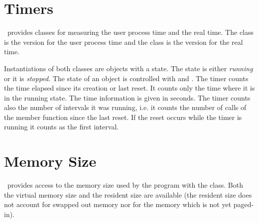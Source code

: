 
\section{Timers}

\cgal\ provides classes for measuring the user process time and the real time.
The class  is the version for the user process time and
the class  is the version for the real time.

Instantiations of both classes are objects with a state. The state is
either {\em running\/} or it is {\em stopped}. The state of an object
 is controlled
with  and  . The timer counts the
time elapsed since its creation or last reset. It counts only the time
where it is in the running state. The time information is given in seconds.
The timer counts also the number of intervals it was running, i.e. it 
counts the number of calls of the  member function since the 
last reset. If the reset occurs while the timer is running it counts as the
first interval.

\section{Memory Size}

\cgal\ provides access to the memory size used by the program with the
 class.  Both the virtual memory size and the
resident size are available (the resident size does not account for
swapped out memory nor for the memory which is not yet paged-in).


